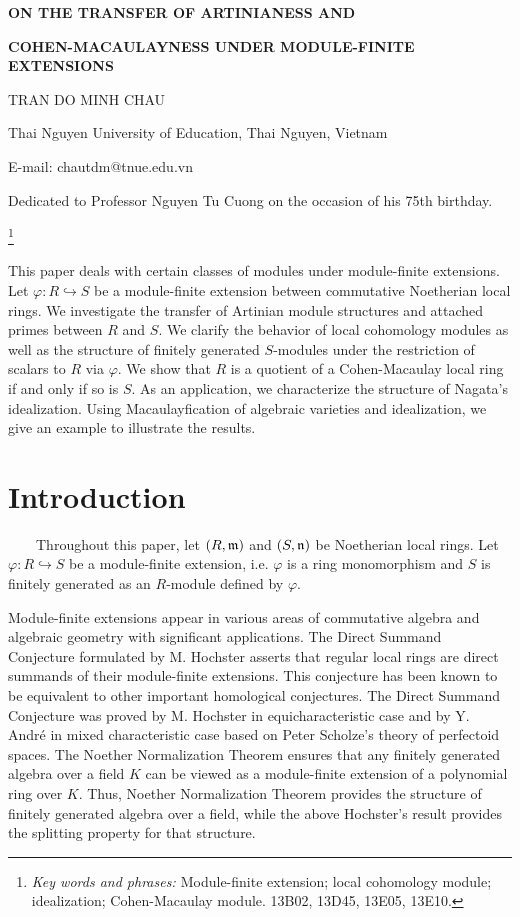 \documentclass[a4papersize]{article}
\begin{document}
	\large
	\centerline{\Large {\bf ON THE TRANSFER OF ARTINIANESS AND  }}
	\smallskip
	\centerline{\Large {\bf COHEN-MACAULAYNESS  UNDER MODULE-FINITE  EXTENSIONS}}
	\smallskip
	
	
	\medskip
	\vskip 0.7cm
	
	\centerline {TRAN DO MINH CHAU}
	\centerline { Thai Nguyen University of Education, Thai Nguyen, Vietnam}
	\centerline {E-mail: chautdm@tnue.edu.vn}
	
	\vskip 0.6cm

	\centerline { Dedicated to Professor Nguyen Tu Cuong  on the occasion of his 75th birthday.}
	
	\vskip 1cm
	
 {\footnote{ {\it{Key words and phrases: }} Module-finite extension; local cohomology module; idealization; Cohen-Macaulay  module. \hfill{} 13B02, 13D45, 13E05,  13E10.}
		
This paper deals with certain classes of modules under module-finite extensions.  Let  $\varphi: R\hookrightarrow S$  be a module-finite extension between commutative Noetherian local rings. We investigate  the transfer of Artinian module structures and attached primes between $R$ and $S$. We clarify the behavior of local cohomology modules as well as the structure of finitely generated $S$-modules under the restriction of scalars to $R$ via $\varphi$. We show that $R$ is a quotient of a Cohen-Macaulay local ring if and only if so is $S$. As an application, we characterize the structure of Nagata's idealization. Using Macaulayfication of  algebraic varieties and idealization, we give an example to illustrate the results.	 
			 		
\section{Introduction}
		
\ \ \ \  Throughout this paper, let $(R,\frak m )$ and $(S,\frak n )$ be  Noetherian local rings. Let  $\varphi: R\hookrightarrow S$  be a module-finite extension, i.e. $\varphi$ is a ring monomorphism and $S$ is  finitely generated as an $R$-module defined by $\varphi$. 
				
Module-finite extensions appear in various areas of commutative algebra and algebraic geometry with significant applications. The  Direct Summand Conjecture  formulated by M. Hochster \cite{Ho1}  asserts that regular local rings are direct summands of their module-finite extensions. This conjecture has been known to be equivalent to other important homological conjectures.  The Direct Summand Conjecture was proved by M. Hochster \cite{Ho1}  in equicharacteristic case and by Y. Andr\'{e} \cite{And} in mixed characteristic case based on Peter Scholze's theory of perfectoid spaces. The Noether Normalization Theorem \cite{EM} ensures that any finitely generated algebra over a field $K$ can be viewed as   a module-finite extension of a  polynomial ring over $K$.  Thus, Noether Normalization Theorem provides the structure of finitely generated algebra over a field, while the above Hochster's result provides the splitting property for that structure.		

}
\end{document}
